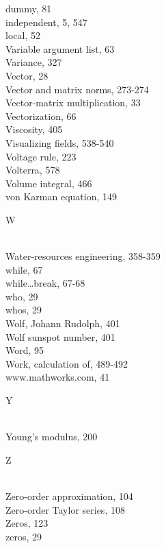 \documentclass[../main.tex]{subfiles}
\begin{document}
\begin{multicols}{3}
    \hspace*{3mm}dummy, 81\\
    \hspace*{3mm}independent, 5, 547\\
    \hspace*{3mm}local, 52\\
    Variable argument list, 63\\
    Variance, 327\\
    Vector, 28\\
    Vector and matrix norms, 273-274\\
    Vector-matrix multiplication, 33\\
    Vectorization, 66\\
    Viscosity, 405\\
    Visualizing fields, 538-540\\
    Voltage rule, 223\\
    Volterra, 578\\
    Volume integral, 466\\
    von Karman equation, 149\vspace*{2mm}\\
    \begin{huge} W \end{huge}\\
    Water-resources engineering, 358-359\\
    while, 67\\
    while\ldots break, 67-68\\
    who, 29\\
    whos, 29\\
    Wolf, Johann Rudolph, 401\\
    Wolf sunspot number, 401\\
    Word, 95\\
    Work, calculation of, 489-492\\
    www.mathworks.com, 41\vspace*{2mm}\\
    \begin{huge} Y \end{huge}\\
    Young's modulus, 200\vspace*{2mm}\\
    \begin{huge} Z \end{huge}\\
    Zero-order approximation, 104\\
    Zero-order Taylor series, 108\\
    Zeros, 123\\
    zeros, 29\\
\end{multicols}
\end{document}
